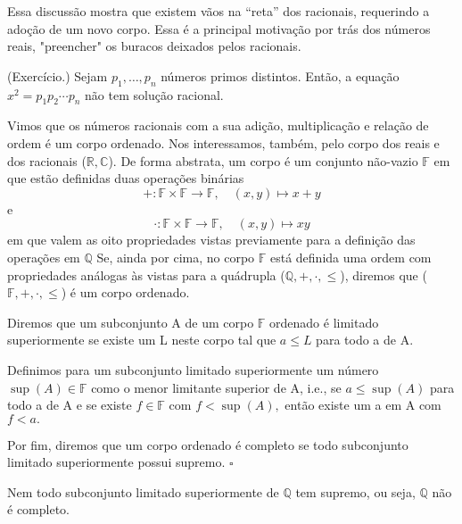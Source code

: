 \documentclass[analysis_notes.tex]{subfiles}
\begin{document}
Essa discuss\~ao mostra que existem v\~aos na ``reta'' dos racionais, requerindo a ado\c c\~ao de um novo corpo. Essa \'e a principal
motiva\c c\~ao por tr\'as dos n\'umeros reais, "preencher" os buracos deixados pelos racionais.
\begin{prop*}
	(Exerc\'icio.) Sejam $p_{1}, \ldots, p_{n}$ n\'umeros primos distintos. Ent\~ao, a equa\c c\~ao $x^{2} = p_{1}p_2\cdots p_{n}$ n\~ao
	tem solu\c c\~ao racional.
\end{prop*}
Vimos que os n\'umeros racionais com a sua adi\c c\~ao, multiplica\c c\~ao e rela\c c\~ao de ordem \'e um corpo ordenado. Nos interessamos,
tamb\'em, pelo corpo dos reais e dos racionais ($\mathbb{R}, \mathbb{C}$). De forma abstrata, um corpo \'e um conjunto n\~ao-vazio
$\mathbb{F}$ em que est\~ao definidas duas opera\c c\~oes bin\'arias
$$
	+:\mathbb{F}\times \mathbb{F}\rightarrow \mathbb{F}, \quad (x, y)\mapsto x + y
$$
e
$$
	\cdot: \mathbb{F}\times \mathbb{F}\rightarrow \mathbb{F}, \quad (x, y)\mapsto xy
$$
em que valem as oito propriedades vistas previamente para a defini\c c\~ao das opera\c c\~oes em $\mathbb{Q}$
Se, ainda por cima, no corpo $\mathbb{F}$ est\'a definida uma ordem com propriedades an\'alogas \`as vistas para a qu\'adrupla
($\mathbb{Q}, +, \cdot, \leq{}$), diremos que ($\mathbb{F}, +, \cdot, \leq{}$) \'e um corpo ordenado.
\begin{def*}
	Diremos que um subconjunto A de um corpo $\mathbb{F}$ ordenado \'e limitado superiormente se existe um L neste corpo tal que $a \leq{L}$ para todo
	a de A.

	Definimos para um subconjunto limitado superiormente um n\'umero $\sup(A)\in \mathbb{F}$ como o menor limitante superior de
	A, i.e., se $a \leq{\sup(A)}$ para todo a de A e se existe $f\in \mathbb{F}$ com $f < \sup(A),$ ent\~ao existe um a em A com $ f < a.$

	Por fim, diremos que um corpo ordenado \'e completo se todo subconjunto limitado superiormente possui supremo. $\square$
\end{def*}
Nem todo subconjunto limitado superiormente de $\mathbb{Q}$ tem supremo, ou seja, $\mathbb{Q}$ n\~ao \'e completo.
\end{document}
